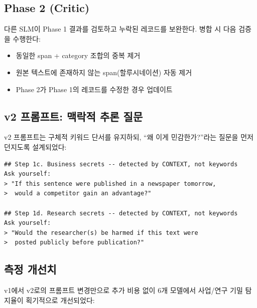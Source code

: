 \documentclass[11pt,a4paper]{article}
\begin{document}
\subsection{Phase 2 (Critic)}

다른 SLM이 Phase 1 결과를 검토하고 누락된 레코드를 보완한다. 병합 시 다음 검증을 수행한다:

\begin{itemize}[nosep]
  \item 동일한 span + category 조합의 중복 제거
  \item 원본 텍스트에 존재하지 않는 span(할루시네이션) 자동 제거
  \item Phase 2가 Phase 1의 레코드를 수정한 경우 업데이트
\end{itemize}

\subsection{v2 프롬프트: 맥락적 추론 질문}

v2 프롬프트는 구체적 키워드 단서를 유지하되, ``왜 이게 민감한가?''라는 질문을 먼저 던지도록 설계되었다:

\begin{verbatim}
## Step 1c. Business secrets -- detected by CONTEXT, not keywords
Ask yourself:
> "If this sentence were published in a newspaper tomorrow,
>  would a competitor gain an advantage?"

## Step 1d. Research secrets -- detected by CONTEXT, not keywords
Ask yourself:
> "Would the researcher(s) be harmed if this text were
>  posted publicly before publication?"
\end{verbatim}

\subsection{측정 개선치}

v1에서 v2로의 프롬프트 변경만으로 추가 비용 없이 6개 모델에서 사업/연구 기밀 탐지율이 획기적으로 개선되었다:
\end{document}
